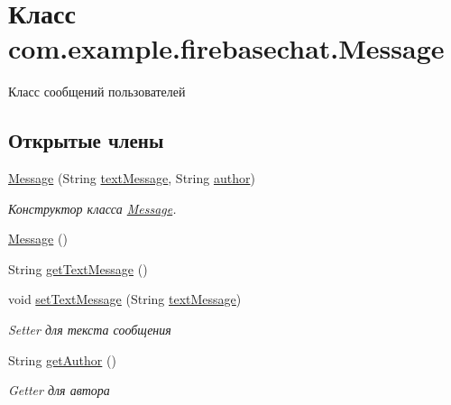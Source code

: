 \hypertarget{classcom_1_1example_1_1firebasechat_1_1_message}{}\section{Класс com.\+example.\+firebasechat.\+Message}
\label{classcom_1_1example_1_1firebasechat_1_1_message}


Класс сообщений пользователей  


\subsection*{Открытые члены}
\begin{DoxyCompactItemize}
\item 
\mbox{\hyperlink{classcom_1_1example_1_1firebasechat_1_1_message_a16d2a1e81245c95a65287af20c897bcf}{Message}} (String \mbox{\hyperlink{classcom_1_1example_1_1firebasechat_1_1_message_acb2c8f619df31749afdc79e92b1481e8}{text\+Message}}, String \mbox{\hyperlink{classcom_1_1example_1_1firebasechat_1_1_message_a8d952ef9a02a74e7c419f335020fea23}{author}})
\begin{DoxyCompactList}\small\item\em Конструктор класса \mbox{\hyperlink{classcom_1_1example_1_1firebasechat_1_1_message}{Message}}. \end{DoxyCompactList}\item 
\mbox{\hyperlink{classcom_1_1example_1_1firebasechat_1_1_message_a6693707a10383562d63555ee5014a9aa}{Message}} ()
\item 
String \mbox{\hyperlink{classcom_1_1example_1_1firebasechat_1_1_message_aefada8da06d095f5c982ec8b556d6554}{get\+Text\+Message}} ()
\item 
void \mbox{\hyperlink{classcom_1_1example_1_1firebasechat_1_1_message_abb5288c3d6bd3e961f9ee1f7680abb65}{set\+Text\+Message}} (String \mbox{\hyperlink{classcom_1_1example_1_1firebasechat_1_1_message_acb2c8f619df31749afdc79e92b1481e8}{text\+Message}})
\begin{DoxyCompactList}\small\item\em Setter для текста сообщения \end{DoxyCompactList}\item 
String \mbox{\hyperlink{classcom_1_1example_1_1firebasechat_1_1_message_a13ca75f96f4b6c16a83190b1ff8f819f}{get\+Author}} ()
\begin{DoxyCompactList}\small\item\em Getter для автора \end{DoxyCompactList}\item 

\end{DoxyCompactItemize}
